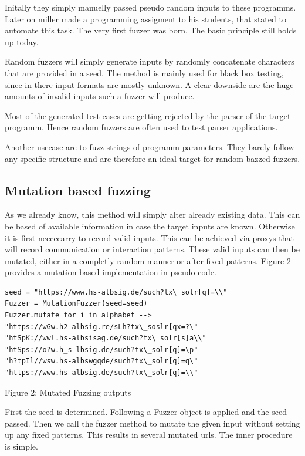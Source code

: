 \documentclass[journal=tosc,final]{iacrtrans}
\begin{document}
Initally they simply manuelly passed pseudo random inputs to these programms. Later on miller made a programming assigment to his students, that stated to automate this task. The very first fuzzer was born. The basic principle still holds up today. 

Random fuzzers will simply generate inputs by randomly concatenate characters that are provided in a seed. The method is mainly used for black box testing, since in there input formats are mostly unknown. A clear downside are the huge amounts of invalid inputs such a fuzzer will produce. 

Most of the generated test cases are getting rejected by the parser of the target programm. Hence random fuzzers are often used to test parser applications.

Another usecase are to fuzz strings of programm parameters. They barely follow any specific structure and are therefore an ideal target for random bazzed fuzzers. 
\subsection{Mutation based fuzzing}
As we already know, this method will simply alter already existing data. This can be based of available information in case the target inputs are known. Otherwise it is first neccecarry to record valid inputs. This can be achieved via proxys that will record communication or interaction patterns. These valid inputs can then be mutated, either in a completly random manner or after fixed patterns. Figure 2 provides a mutation based implementation in pseudo code. 

\begin{center}
\begin{shaded}
\begin{verbatim}
seed = "https://www.hs-albsig.de/such?tx\_solr[q]=\\"
Fuzzer = MutationFuzzer(seed=seed)
Fuzzer.mutate for i in alphabet -->
"https://wGw.h2-albsig.re/sLh?tx\_soslr[qx=?\"
"htSpK://wwl.hs-albsisag.de/such?tx\_solr[s]a\\"
"htSps://o?w.h_s-lbsig.de/such?tx\_solr[q]=\p"
"h?tpIl//wsw.hs-albswgqde/such?tx\_solr[q]=q\"
"https://www.hs-albsig.de/such?tx\_solr[q]=\\"
\end{verbatim}
\vspace{2mm} Figure 2: Mutated Fuzzing outputs
\end{shaded}
\end{center}
First the seed is determined. Following a Fuzzer object is applied and the seed passed. Then we call the fuzzer method to mutate the given input without setting up any fixed patterns. This results in several mutated urls. The inner procedure is simple.
\end{document}
